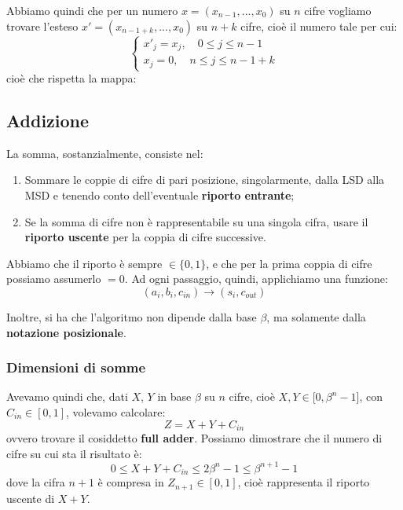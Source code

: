 \documentclass[a4paper,11pt]{article}
\begin{document}
Abbiamo quindi che per un numero $x = (x_{n-1}, ..., x_0)$ su $n$ cifre vogliamo trovare l'esteso $x' = (x_{n-1+k}, ..., x_0)$ su $n + k$ cifre, cioè il numero tale per cui:
\[
	\begin{cases}
		x'_j = x_j, \quad 0 \leq j \leq n - 1 \\ 
		x_j = 0, \quad n \leq j \leq n - 1 + k
	\end{cases}
\]
cioè che rispetta la mappa:
\begin{center}
\end{center}

\subsection{Addizione}
La somma, sostanzialmente, consiste nel:
\begin{enumerate}
	\item Sommare le coppie di cifre di pari posizione, singolarmente, dalla LSD alla MSD e tenendo conto dell'eventuale \textbf{riporto entrante};
	\item Se la somma di cifre non è rappresentabile su una singola cifra, usare il \textbf{riporto uscente} per la coppia di cifre successive.
\end{enumerate}
Abbiamo che il riporto è sempre $\in \{0, 1\}$, e che per la prima coppia di cifre possiamo assumerlo $= 0$.
Ad ogni passaggio, quindi, applichiamo una funzione:
$$
(a_i, b_i, c_{in}) \rightarrow (s_i, c_{out})
$$

Inoltre, si ha che l'algoritmo non dipende dalla base $\beta$, ma solamente dalla \textbf{notazione posizionale}.

\subsubsection{Dimensioni di somme}
Avevamo quindi che, dati $X$, $Y$ in base $\beta$ su $n$ cifre,  cioè $X, Y \in [0, \beta^n - 1$], con $C_{in} \in [0, 1]$, volevamo calcolare:
$$ Z = X + Y + C_{in} $$
ovvero trovare il cosiddetto \textbf{full adder}.
Possiamo dimostrare che il numero di cifre su cui sta il risultato è:
$$ 0 \leq X + Y + C_{in} \leq 2\beta^n - 1 \leq \beta^{n+1} - 1 $$
dove la cifra $n+1$ è compresa in $Z_{n+1} \in [0, 1]$, cioè rappresenta il riporto uscente di $X + Y$. 
\end{document}
